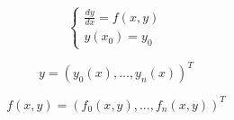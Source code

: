 \documentclass{extreport}
\begin{document}
$$
\begin{cases}
\frac{dy}{dx} 
=
f(x,y)
\\
y(x_0) 
=
y_0
\end{cases}
$$

$$
y
=
(y_0(x),...,y_n(x) )^T
$$

$$
f(x,y)
=
(f_0(x,y),...,f_n(x,y))^T
$$
\end{document}
